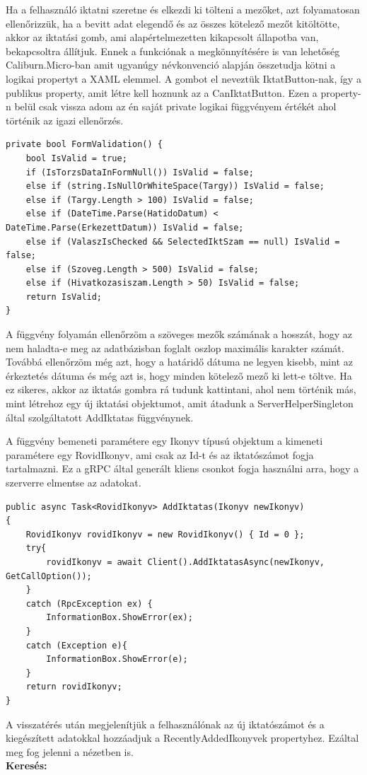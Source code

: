 \documentclass[
]{thesis-ekf}
\theoremstyle{definition}
\theoremstyle{remark}
\begin{document}
Ha a felhasználó iktatni szeretne és elkezdi ki tölteni a mezőket, azt folyamatosan ellenőrizzük, ha a bevitt adat elegendő és az összes kötelező mezőt kitöltötte, akkor az iktatási gomb, ami alapértelmezetten kikapcsolt állapotba van, bekapcsoltra állítjuk. Ennek a funkciónak a megkönnyítésére is van lehetőség Caliburn.Micro-ban amit ugyanúgy névkonvenció alapján összetudja kötni a logikai propertyt a XAML elemmel. A gombot el neveztük IktatButton-nak, így a publikus property, amit létre kell hoznunk az a CanIktatButton.
Ezen a property-n belül csak vissza adom az én saját private logikai függvényem értékét ahol történik az igazi ellenőrzés. 
\begin{lstlisting}[caption={Iktatáshoz tartozó adatok validálása.},captionpos=b]
private bool FormValidation() {
	bool IsValid = true;
	if (IsTorzsDataInFormNull()) IsValid = false;
	else if (string.IsNullOrWhiteSpace(Targy)) IsValid = false;
	else if (Targy.Length > 100) IsValid = false;
	else if (DateTime.Parse(HatidoDatum) < DateTime.Parse(ErkezettDatum)) IsValid = false;
	else if (ValaszIsChecked && SelectedIktSzam == null) IsValid = false;
	else if (Szoveg.Length > 500) IsValid = false;
	else if (Hivatkozasiszam.Length > 50) IsValid = false;
	return IsValid;
}
\end{lstlisting}
A függvény folyamán ellenőrzöm a szöveges mezők számának a hosszát, hogy az nem haladta-e meg az adatbázisban foglalt oszlop maximális karakter számát. Továbbá ellenőrzöm még azt, hogy a határidő dátuma ne legyen kisebb, mint az érkeztetés dátuma és még azt is, hogy minden kötelező mező ki lett-e töltve. Ha ez sikeres, akkor az iktatás gombra rá tudunk kattintani, ahol nem történik más, mint létrehoz egy új iktatási objektumot, amit átadunk a ServerHelperSingleton által szolgáltatott AddIktatas függvénynek. 

A függvény bemeneti paramétere egy Ikonyv típusú objektum a kimeneti paramétere egy RovidIkonyv, ami csak az Id-t és az iktatószámot fogja tartalmazni. Ez a gRPC által generált kliens csonkot fogja használni arra, hogy a szerverre elmentse az adatokat. 
\begin{lstlisting}[caption={Iktatás hozzzáadása.},captionpos=b]
public async Task<RovidIkonyv> AddIktatas(Ikonyv newIkonyv)
{
	RovidIkonyv rovidIkonyv = new RovidIkonyv() { Id = 0 };
	try{
		rovidIkonyv = await Client().AddIktatasAsync(newIkonyv, GetCallOption());
	}
	catch (RpcException ex)	{
		InformationBox.ShowError(ex);
	}
	catch (Exception e){
		InformationBox.ShowError(e);
	}
	return rovidIkonyv;
}

\end{lstlisting}
A visszatérés után megjelenítjük a felhasználónak az új iktatószámot és a kiegészített adatokkal hozzáadjuk a RecentlyAddedIkonyvek propertyhez. Ezáltal meg fog jelenni a nézetben is.\\
\textbf{Keresés:}
\end{document}
